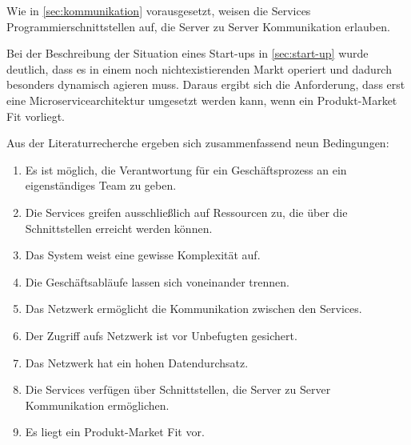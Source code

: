 Wie in \cref{sec:kommunikation} vorausgesetzt, weisen die Services Programmierschnittstellen auf, die Server zu Server Kommunikation erlauben.

Bei der Beschreibung der Situation eines Start-ups in \cref{sec:start-up} wurde deutlich, dass es in einem noch nichtexistierenden Markt operiert und dadurch besonders dynamisch agieren muss. Daraus ergibt sich die Anforderung, dass erst eine Microservicearchitektur umgesetzt werden kann, wenn ein Produkt-Market Fit vorliegt.

Aus der Literaturrecherche ergeben sich zusammenfassend neun Bedingungen:
\begin{enumerate}
	\item Es ist möglich, die Verantwortung für ein Geschäftsprozess an ein eigenständiges Team zu geben.
	\item Die Services greifen ausschließlich auf Ressourcen zu, die über die Schnittstellen erreicht werden können.
	\item Das System weist eine gewisse Komplexität auf.
	\item Die Geschäftsabläufe lassen sich voneinander trennen.
	\item Das Netzwerk ermöglicht die Kommunikation zwischen den Services.
	\item Der Zugriff aufs Netzwerk ist vor Unbefugten gesichert.
	\item Das Netzwerk hat ein hohen Datendurchsatz.
	\item Die Services verfügen über Schnittstellen, die Server zu Server Kommunikation ermöglichen.
	\item Es liegt ein Produkt-Market Fit vor.
\end{enumerate}